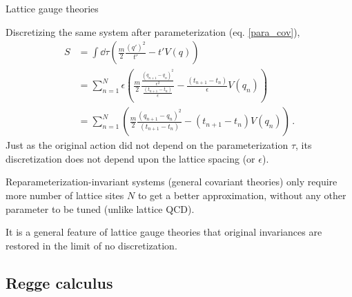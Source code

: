 \documentclass{beamer}
\begin{document}
\begin{frame}{Lattice gauge theories}
    \begin{list}{\maltese}{\leftmargin=1em \itemindent=0em}
        \item<1-> Discretizing the same system after parameterization (eq. \ref{para_cov}),
        \begin{align}
            S&=\int\dd{\tau}\left(\frac{m}{2}\frac{(q')^2}{t'}-t'V(q)\right)\\
            &=\sum_{n=1}^N\epsilon\left(\frac{m}{2}\frac{\frac{(q_{n+1}-q_n)^2}{\epsilon^2}}{\frac{(t_{n+1}-t_n)}{\epsilon}}-\frac{(t_{n+1}-t_n)}{\epsilon}V(q_n)\right)\\
            &=\sum_{n=1}^N\left(\frac{m}{2}\frac{(q_{n+1}-q_n)^2}{(t_{n+1}-t_n)}-(t_{n+1}-t_n)V(q_n)\right)\,.
        \end{align}
        Just as the original action did not depend on the parameterization $\tau$, its discretization does not depend upon the lattice spacing (or $\epsilon$).
        \item<2-> Reparameterization-invariant systems (general covariant theories) only require more number of lattice sites $N$ to get a better approximation, without any other parameter to be tuned (unlike lattice QCD).
        \item<3-> It is a general feature of lattice gauge theories that original invariances are restored in the limit of no discretization.
    \end{list}
\end{frame}

\subsection{Regge calculus}
\end{document}
